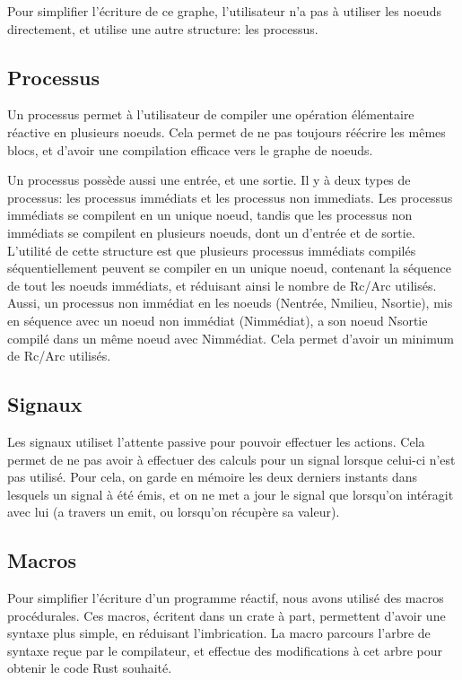 \documentclass[a4paper]{article}
\renewcommand{\(}{\left(}
\renewcommand{\)}{\right)}
\begin{document}
Pour simplifier l'écriture de ce graphe, l'utilisateur n'a pas à utiliser les
noeuds directement, et utilise une autre structure: les processus.

\subsection{Processus}
Un processus permet à l'utilisateur de compiler une opération élémentaire
réactive en plusieurs noeuds. Cela permet de ne pas toujours réécrire les mêmes
blocs, et d'avoir une compilation efficace vers le graphe de noeuds.

Un processus possède aussi une entrée, et une sortie. Il y à deux types de
processus: les processus immédiats et les processus non immediats. Les processus
immédiats se compilent en un unique noeud, tandis que les processus non
immédiats se compilent en plusieurs noeuds, dont un d'entrée et de sortie.
L'utilité de cette structure est que plusieurs processus immédiats compilés
séquentiellement peuvent se compiler en un unique noeud, contenant la séquence
de tout les noeuds immédiats, et réduisant ainsi le nombre de Rc/Arc utilisés.
Aussi, un processus non immédiat en les noeuds (Nentrée, Nmilieu,
Nsortie), mis en séquence avec un noeud non immédiat (Nimmédiat), a son noeud
Nsortie compilé dans un même noeud avec Nimmédiat. Cela permet d'avoir un
minimum de Rc/Arc utilisés.

\subsection{Signaux}

Les signaux utiliset l'attente passive pour pouvoir effectuer les actions. Cela
permet de ne pas avoir à effectuer des calculs pour un signal lorsque celui-ci
n'est pas utilisé. Pour cela, on garde en mémoire les deux derniers instants
dans lesquels un signal à été émis, et on ne met a jour le signal que lorsqu'on
intéragit avec lui (a travers un emit, ou lorsqu'on récupère sa valeur).

\subsection{Macros}

Pour simplifier l'écriture d'un programme réactif, nous avons utilisé des macros
procédurales. Ces macros, écritent dans un crate à part, permettent d'avoir une
syntaxe plus simple, en réduisant l'imbrication. La macro parcours l'arbre de
syntaxe reçue par le compilateur, et effectue des modifications à cet arbre pour
obtenir le code Rust souhaité.
\end{document}
